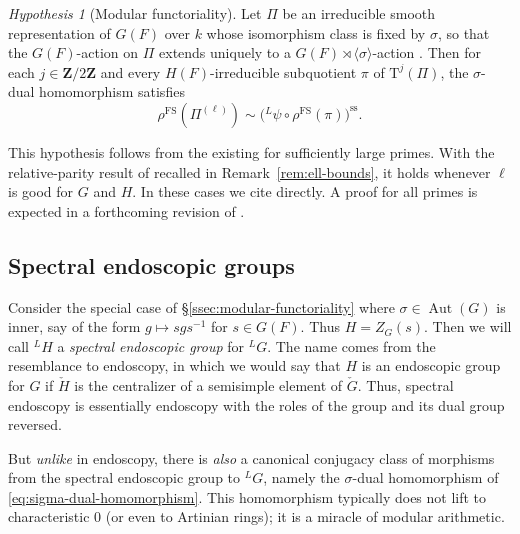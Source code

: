 \documentclass[reqno]{amsart}
\numberwithin{equation}{subsection}
\newcommand{\Z}{\mathbf{Z}}
\newcommand{\ld}{{}^L}
\DeclareMathOperator{\Aut}{Aut}
\DeclareMathOperator{\FS}{FS}
\newcommand{\rT}{\ensuremath{\mathrm{T}}\xspace}
\newcommand{\chG}{\check{G}}
\newcommand{\chH}{\check{H}}
\renewcommand{\ss}{\mathrm{ss}}
\theoremstyle{remark}
\newtheorem{hypothesis}[thm]{Hypothesis}
\numberwithin{equation}{subsection}
\numberwithin{figure}{subsection}
\begin{document}
\begin{hypothesis}[Modular functoriality]\label{hyp:modular-functoriality}
Let $\Pi$ be an irreducible smooth representation of $G(F)$ over $k$ whose isomorphism class is fixed by $\sigma$, so that the $G(F)$-action on $\Pi$ extends uniquely to a $G(F) \rtimes \langle\sigma\rangle$-action \cite[Proposition 6.1]{TV}. Then for each $j \in \Z/2\Z$ and every $H(F)$-irreducible subquotient $\pi$ of $\rT^{j}(\Pi)$, the $\sigma$-dual homomorphism satisfies
\[
\rho^{\FS}(\Pi^{(\ell)})\sim\bigl(\ld\psi\circ\rho^{\FS}(\pi)\bigr)^{\ss}.
\] 
\end{hypothesis}

This hypothesis follows from the existing \cite[Theorem 1.3.1]{F24} for sufficiently large primes. With the relative-parity result of \cite{Wei26} recalled in Remark~\ref{rem:ell-bounds}, it holds whenever $\ell$ is good for $G$ and $H$. In these cases we cite \cite{F24} directly. A proof for all primes is expected in a forthcoming revision of \cite{F24}.


\subsection{Spectral endoscopic groups} Consider the special case of \S \ref{ssec:modular-functoriality} where $\sigma \in \Aut(G)$ is inner, say of the form $g \mapsto sgs^{-1}$ for $s \in G(F)$. Thus $H = Z_G(s)$. Then we will call $\ld H$ a \emph{spectral endoscopic group} for $\ld G$. The name comes from the resemblance to endoscopy, in which we would say that $H$ is an endoscopic group for $G$ if $\chH$ is the centralizer of a semisimple element of $\chG$. Thus, spectral endoscopy is essentially endoscopy with the roles of the group and its dual group reversed.

But \emph{unlike} in endoscopy, there is \emph{also} a canonical conjugacy class of morphisms from the spectral endoscopic group to $\ld G$, namely the $\sigma$-dual homomorphism of \eqref{eq:sigma-dual-homomorphism}. This homomorphism typically does not lift to characteristic $0$ (or even to Artinian rings); it is a miracle of modular arithmetic.
\end{document}
